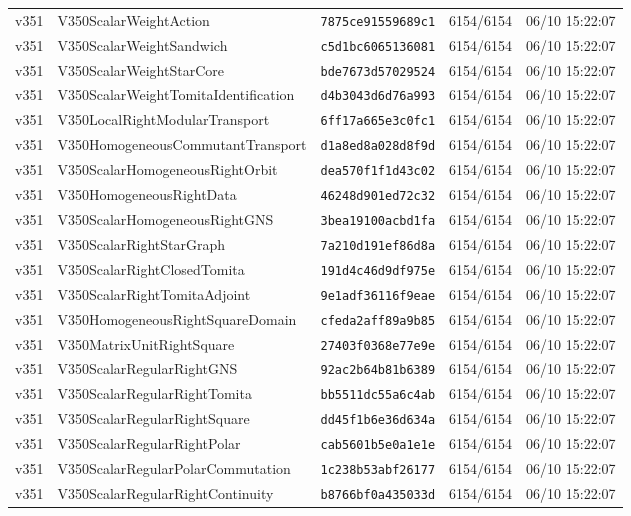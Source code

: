 \documentclass[11pt]{article}
\theoremstyle{definition}\newtheorem{deriv}{Derivation}
\begin{document}
{\begin{longtable}{@{}lllll@{}}
v351 & V350ScalarWeightAction & \texttt{7875ce91559689c1} & 6154/6154 & 06/10 15:22:07 \\
v351 & V350ScalarWeightSandwich & \texttt{c5d1bc6065136081} & 6154/6154 & 06/10 15:22:07 \\
v351 & V350ScalarWeightStarCore & \texttt{bde7673d57029524} & 6154/6154 & 06/10 15:22:07 \\
v351 & V350ScalarWeightTomitaIdentification & \texttt{d4b3043d6d76a993} & 6154/6154 & 06/10 15:22:07 \\
v351 & V350LocalRightModularTransport & \texttt{6ff17a665e3c0fc1} & 6154/6154 & 06/10 15:22:07 \\
v351 & V350HomogeneousCommutantTransport & \texttt{d1a8ed8a028d8f9d} & 6154/6154 & 06/10 15:22:07 \\
v351 & V350ScalarHomogeneousRightOrbit & \texttt{dea570f1f1d43c02} & 6154/6154 & 06/10 15:22:07 \\
v351 & V350HomogeneousRightData & \texttt{46248d901ed72c32} & 6154/6154 & 06/10 15:22:07 \\
v351 & V350ScalarHomogeneousRightGNS & \texttt{3bea19100acbd1fa} & 6154/6154 & 06/10 15:22:07 \\
v351 & V350ScalarRightStarGraph & \texttt{7a210d191ef86d8a} & 6154/6154 & 06/10 15:22:07 \\
v351 & V350ScalarRightClosedTomita & \texttt{191d4c46d9df975e} & 6154/6154 & 06/10 15:22:07 \\
v351 & V350ScalarRightTomitaAdjoint & \texttt{9e1adf36116f9eae} & 6154/6154 & 06/10 15:22:07 \\
v351 & V350HomogeneousRightSquareDomain & \texttt{cfeda2aff89a9b85} & 6154/6154 & 06/10 15:22:07 \\
v351 & V350MatrixUnitRightSquare & \texttt{27403f0368e77e9e} & 6154/6154 & 06/10 15:22:07 \\
v351 & V350ScalarRegularRightGNS & \texttt{92ac2b64b81b6389} & 6154/6154 & 06/10 15:22:07 \\
v351 & V350ScalarRegularRightTomita & \texttt{bb5511dc55a6c4ab} & 6154/6154 & 06/10 15:22:07 \\
v351 & V350ScalarRegularRightSquare & \texttt{dd45f1b6e36d634a} & 6154/6154 & 06/10 15:22:07 \\
v351 & V350ScalarRegularRightPolar & \texttt{cab5601b5e0a1e1e} & 6154/6154 & 06/10 15:22:07 \\
v351 & V350ScalarRegularPolarCommutation & \texttt{1c238b53abf26177} & 6154/6154 & 06/10 15:22:07 \\
v351 & V350ScalarRegularRightContinuity & \texttt{b8766bf0a435033d} & 6154/6154 & 06/10 15:22:07 \\

\end{longtable}}
\end{document}
